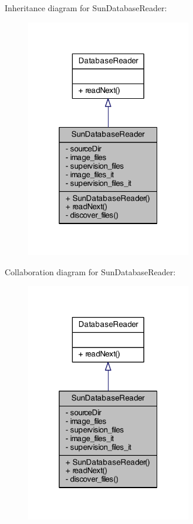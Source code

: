 Inheritance diagram for Sun\+Database\+Reader\+:\nopagebreak
\begin{figure}[H]
\begin{center}
\leavevmode
\includegraphics[width=205pt]{class_sun_database_reader__inherit__graph}
\end{center}
\end{figure}


Collaboration diagram for Sun\+Database\+Reader\+:\nopagebreak
\begin{figure}[H]
\begin{center}
\leavevmode
\includegraphics[width=205pt]{class_sun_database_reader__coll__graph}
\end{center}
\end{figure}


